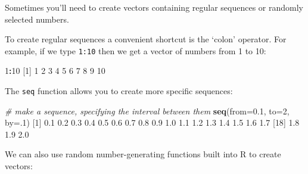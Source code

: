 \documentclass[]{article}
\newenvironment{Shaded}{\begin{snugshade}}{\end{snugshade}}
\newcommand{\CommentTok}[1]{\textcolor[rgb]{0.56,0.35,0.01}{\textit{#1}}}
\newcommand{\DataTypeTok}[1]{\textcolor[rgb]{0.13,0.29,0.53}{#1}}
\newcommand{\DecValTok}[1]{\textcolor[rgb]{0.00,0.00,0.81}{#1}}
\newcommand{\FloatTok}[1]{\textcolor[rgb]{0.00,0.00,0.81}{#1}}
\newcommand{\KeywordTok}[1]{\textcolor[rgb]{0.13,0.29,0.53}{\textbf{#1}}}
\newcommand{\NormalTok}[1]{#1}
\newcommand{\OperatorTok}[1]{\textcolor[rgb]{0.81,0.36,0.00}{\textbf{#1}}}
\begin{document}
Sometimes you'll need to create vectors containing regular sequences or randomly
selected numbers.

To create regular sequences a convenient shortcut is the `colon' operator. For
example, if we type \texttt{1:10} then we get a vector of numbers from 1 to 10:

\begin{Shaded}
\begin{Highlighting}[]
\DecValTok{1}\OperatorTok{:}\DecValTok{10}
\NormalTok{ [}\DecValTok{1}\NormalTok{]  }\DecValTok{1}  \DecValTok{2}  \DecValTok{3}  \DecValTok{4}  \DecValTok{5}  \DecValTok{6}  \DecValTok{7}  \DecValTok{8}  \DecValTok{9} \DecValTok{10}
\end{Highlighting}
\end{Shaded}

The \texttt{seq} function allows you to create more specific sequences:

\begin{Shaded}
\begin{Highlighting}[]
\CommentTok{# make a sequence, specifying the interval between them}
\KeywordTok{seq}\NormalTok{(}\DataTypeTok{from=}\FloatTok{0.1}\NormalTok{, }\DataTypeTok{to=}\DecValTok{2}\NormalTok{, }\DataTypeTok{by=}\NormalTok{.}\DecValTok{1}\NormalTok{)}
\NormalTok{ [}\DecValTok{1}\NormalTok{] }\FloatTok{0.1} \FloatTok{0.2} \FloatTok{0.3} \FloatTok{0.4} \FloatTok{0.5} \FloatTok{0.6} \FloatTok{0.7} \FloatTok{0.8} \FloatTok{0.9} \FloatTok{1.0} \FloatTok{1.1} \FloatTok{1.2} \FloatTok{1.3} \FloatTok{1.4} \FloatTok{1.5} \FloatTok{1.6} \FloatTok{1.7}
\NormalTok{[}\DecValTok{18}\NormalTok{] }\FloatTok{1.8} \FloatTok{1.9} \FloatTok{2.0}
\end{Highlighting}
\end{Shaded}

We can also use random number-generating functions built into R to create
vectors:
\end{document}
